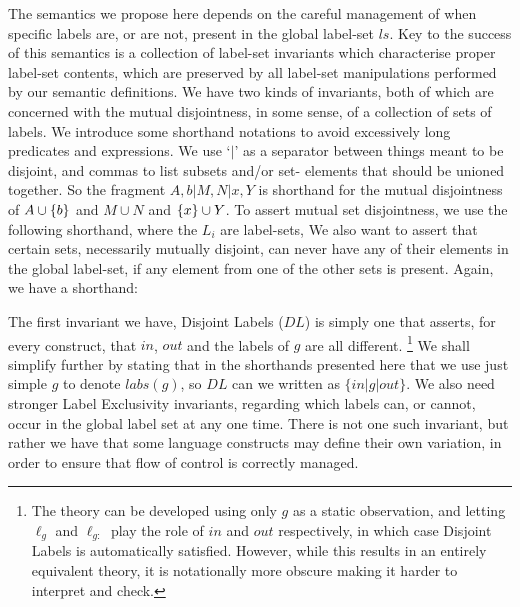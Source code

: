 The semantics we propose here depends on the careful management
of when specific labels are, or are not,
present in the global label-set $ls$.
Key to the success of this semantics is a collection of label-set invariants
which characterise proper label-set contents,
which are preserved by all label-set manipulations performed
by our semantic definitions.
We have two kinds of invariants,
both of which are concerned with the mutual disjointness, in some sense,
of a collection of sets of labels.
We introduce some shorthand notations
to avoid excessively long predicates and expressions.
We use `$\mid$' as a separator between things meant to be disjoint,
and commas to list subsets and/or set- elements that should be unioned together.
So the fragment $ A,b | M,N | x,Y $
is shorthand for the mutual disjointness of
$A \cup \{{b}\}$ and $M \cup N$ and $\{{x}\} \cup Y$.
To assert mutual set disjointness,
we use the following shorthand, where the $L_i$ are label-sets,
We also want to assert that certain sets, necessarily mutually disjoint,
can never have any of their elements in the global label-set,
if any element from one of the other sets is present.
Again, we have a shorthand:

The first invariant we have, Disjoint Labels ($DL$) is simply one that asserts,
for every construct, that $in$, $out$ and the labels of $g$
are all different.
\footnote{The theory can be developed using only $g$ as a static observation,
and letting $\ell_g$ and $\ell_{g:}$ play the role of $in$ and $out$
respectively, in which case Disjoint Labels is automatically satisfied.
However, while this results in an entirely equivalent theory,
it is notationally more obscure
making it harder to interpret and check.
}%
We shall simplify further by stating that in the shorthands presented
here that we use just simple $g$ to denote $labs(g)$,
so $DL$ can we written as $\{in|g|out\}$.
We also need stronger Label Exclusivity invariants,
regarding which labels can, or cannot,
occur in the global label set at any one time.
There is not one such invariant,
but rather we have that some language constructs may define their own
variation, in order to ensure that flow of control is correctly managed.

